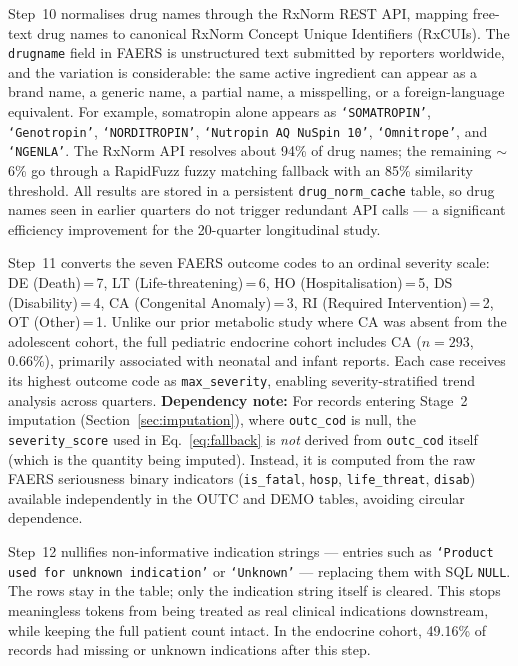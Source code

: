 \documentclass[10pt,twocolumn]{article}
\newcommand{\FAERS}{\textsf{FAERS}\xspace}
\begin{document}
Step~10 normalises drug names through the RxNorm REST API, mapping free-text drug names to canonical RxNorm Concept Unique Identifiers (RxCUIs). The \texttt{drugname} field in \FAERS is unstructured text submitted by reporters worldwide, and the variation is considerable: the same active ingredient can appear as a brand name, a generic name, a partial name, a misspelling, or a foreign-language equivalent. For example, somatropin alone appears as \texttt{`SOMATROPIN'}, \texttt{`Genotropin'}, \texttt{`NORDITROPIN'}, \texttt{`Nutropin AQ NuSpin 10'}, \texttt{`Omnitrope'}, and \texttt{`NGENLA'}. The RxNorm API resolves about 94\% of drug names; the remaining ${\sim}$6\% go through a RapidFuzz fuzzy matching fallback with an 85\% similarity threshold. All results are stored in a persistent \texttt{drug\_norm\_cache} table, so drug names seen in earlier quarters do not trigger redundant API calls --- a significant efficiency improvement for the 20-quarter longitudinal study.
 
Step~11 converts the seven \FAERS outcome codes to an ordinal severity scale: DE (Death)\,=\,7, LT (Life-threatening)\,=\,6, HO (Hospitalisation)\,=\,5, DS (Disability)\,=\,4, CA (Congenital Anomaly)\,=\,3, RI (Required Intervention)\,=\,2, OT (Other)\,=\,1. Unlike our prior metabolic study where CA was absent from the adolescent cohort, the full pediatric endocrine cohort includes CA ($n = 293$, 0.66\%), primarily associated with neonatal and infant reports. Each case receives its highest outcome code as \texttt{max\_severity}, enabling severity-stratified trend analysis across quarters. \textbf{Dependency note:} For records entering Stage~2 imputation (Section~\ref{sec:imputation}), where \texttt{outc\_cod} is null, the \texttt{severity\_score} used in Eq.~\ref{eq:fallback} is \emph{not} derived from \texttt{outc\_cod} itself (which is the quantity being imputed). Instead, it is computed from the raw FAERS seriousness binary indicators (\texttt{is\_fatal}, \texttt{hosp}, \texttt{life\_threat}, \texttt{disab}) available independently in the OUTC and DEMO tables, avoiding circular dependence.
 
Step~12 nullifies non-informative indication strings --- entries such as \texttt{`Product used for unknown indication'} or \texttt{`Unknown'} --- replacing them with SQL \texttt{NULL}. The rows stay in the table; only the indication string itself is cleared. This stops meaningless tokens from being treated as real clinical indications downstream, while keeping the full patient count intact. In the endocrine cohort, 49.16\% of records had missing or unknown indications after this step.
 
\end{document}
